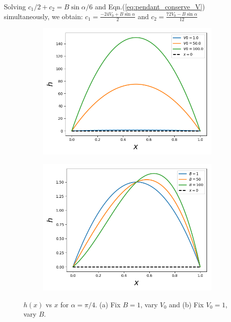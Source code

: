 \documentclass{article}
\begin{document}
Solving 
$c_{1}/2 + c_{2} = B\sin{\alpha}/6$ and Eqn.(\ref{eq:pendant_conserve_V}) simultaneously, we obtain: $c_{1} =  \frac{-24V_{0} + B\sin{\alpha}}{2}$ and $c_{2} = \frac{72 V_{0} - B\sin{\alpha}}{12}$
\begin{figure}[ht]
\begin{subfigure}{.5\textwidth}
  \centering
  \includegraphics[scale=0.35]
  {Figs/pendant_droplet_plot_h_fix_B_vary_V0.png}  
  \caption{}
  \label{fig:vary_V0}
\end{subfigure}
\begin{subfigure}{.5\textwidth}
  \centering
  \includegraphics[scale = 0.35]
  {Figs/pendant_droplet_plot_h_fix_V0_vary_B.png}  
  \caption{}
  \label{fig:vary_B}
\end{subfigure}
\caption{$h(x)$ vs $x$ for $\alpha = \pi/4$. (a) Fix $B=1$, vary $V_{0}$ and (b) Fix $V_{0}=1$, vary $B$.}
\label{fig:fig}
\end{figure}
\end{document}
